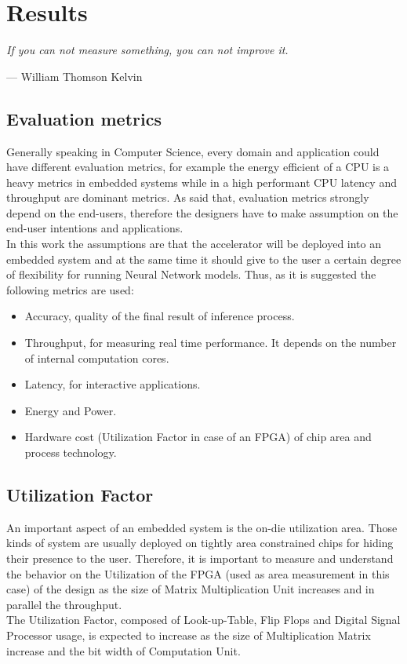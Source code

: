 \chapter{Results}

\epigraph{ \textit{If you can not measure something, you can not improve it.}}{--- \textup{William Thomson Kelvin}}

\section{Evaluation metrics}
Generally speaking in Computer Science, every domain and application could have different evaluation metrics, for example the energy efficient of a CPU is a heavy metrics in embedded systems while in a high performant CPU latency and throughput are dominant metrics. As said that, evaluation metrics strongly depend on the end-users, therefore the designers have to make assumption on the end-user intentions and applications.\\
In this work the assumptions are that the accelerator will be deployed into an embedded system and at the same time it should give to the user a certain degree of flexibility for running Neural Network models. Thus, as it is suggested \cite{paper:1} the following metrics are used:
\begin{itemize}
\item Accuracy, quality of the final result of inference process.
\item Throughput, for measuring real time performance. It depends on the number of internal computation cores.
\item Latency, for interactive applications.
\item Energy and Power.
\item Hardware cost (Utilization Factor in case of an FPGA) of chip area and process technology.
\end{itemize}
\newpage
\section{Utilization Factor}
An important aspect of an embedded system is the on-die utilization area. Those kinds of system are usually deployed on tightly area constrained chips for hiding their presence to the user.
Therefore, it is important to measure and understand the behavior on the Utilization of the FPGA (used as area measurement in this case) of the design as the size of Matrix Multiplication Unit increases and in parallel the throughput.\\
The Utilization Factor, composed of Look-up-Table, Flip Flops and Digital Signal Processor usage, is expected to increase as the size of Multiplication Matrix increase and the bit width of Computation Unit.

